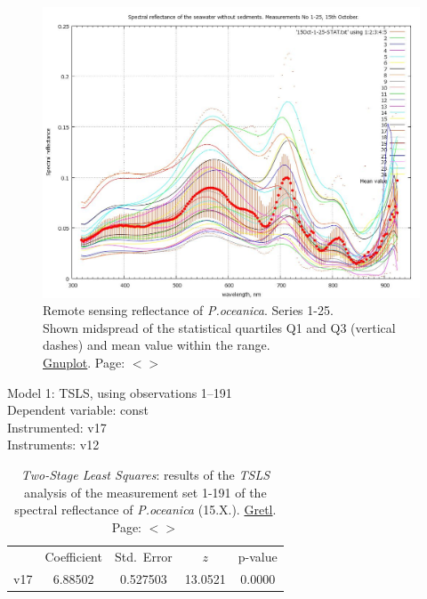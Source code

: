 \documentclass[11pt]{article}
\begin{document}
\begin{appendices}
\begin{figure}[H]
	\begin{center}
		\includegraphics[scale=0.35]{GNU-12.jpg}
		\caption{Remote sensing reflectance of \textit{P.oceanica}. Series 1-25. \\Shown midspread of the statistical quartiles Q1 and Q3 (vertical dashes) and mean value within the range. \\ \href{http://www.gnuplot.info/}{Gnuplot}­. Page: $<$\pageref{page-21}$>$}
		\label{fig:A.26}
	\end{center}
\end{figure}

\begin{table}[H]
	\caption{\textit{Two-Stage Least Squares}: results of the \textit{TSLS} analysis of the measurement set 1-191 of the spectral reflectance of \textit{P.oceanica} (15.X.). \href{http://gretl.sourceforge.net/}{Gretl}. Page: $<$\pageref{page-41}$>$}
	\begin{center}
		Model 1: TSLS, using observations 1--191\\
		Dependent variable: const\\
		Instrumented: v17 \\
		Instruments: v12 \\

	\vspace{1em}

	\begin{tabular}{|c c c c c|}
		  &  {Coefficient} &  {Std.\ Error} &  {$z$} &    {p-value} \\[1ex]
		v17 &  6.88502 & 0.527503 & 13.0521 & 0.0000 \\
	\end{tabular}


\end{center}
\end{table}
\end{appendices}
\end{document}

